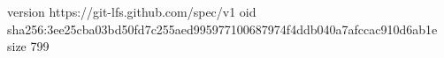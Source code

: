 version https://git-lfs.github.com/spec/v1
oid sha256:3ee25cba03bd50fd7c255aed995977100687974f4ddb040a7afccac910d6ab1e
size 799
